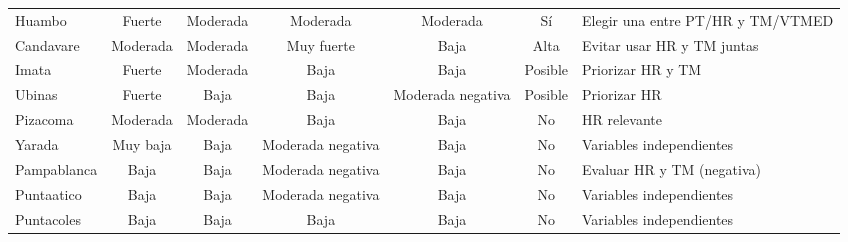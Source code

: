 \begin{table}[ht!]
{\begin{tabular}{lcccccl}
Huambo             & Fuerte          & Moderada        & Moderada        & Moderada         & Sí                  & Elegir una entre PT/HR y TM/VTMED \\
Candavare          & Moderada        & Moderada        & Muy fuerte      & Baja             & Alta                & Evitar usar HR y TM juntas   \\
Imata              & Fuerte          & Moderada        & Baja            & Baja             & Posible             & Priorizar HR y TM            \\
Ubinas             & Fuerte          & Baja            & Baja            & Moderada negativa & Posible             & Priorizar HR                 \\
Pizacoma           & Moderada        & Moderada        & Baja            & Baja             & No                  & HR relevante                 \\
Yarada             & Muy baja        & Baja            & Moderada negativa & Baja             & No                  & Variables independientes     \\
Pampablanca        & Baja            & Baja            & Moderada negativa & Baja             & No                  & Evaluar HR y TM (negativa)   \\
Puntaatico         & Baja            & Baja            & Moderada negativa & Baja             & No                  & Variables independientes     \\
Puntacoles         & Baja            & Baja            & Baja            & Baja             & No                  & Variables independientes     \\
\bottomrule
\end{tabular}%
}
\end{table}








